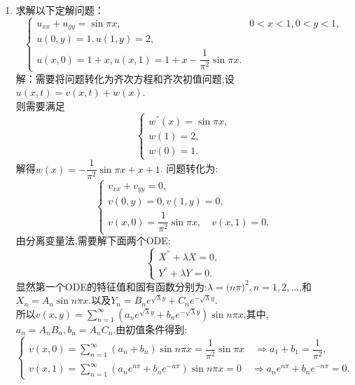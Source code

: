 \documentclass[11pt]{article}
\begin{document}
\begin{enumerate}
        \item 求解以下定解问题：
           \[
        \left\{
         \begin{array}{lr}
         u_{xx}+u_{yy}=\sin \pi x,&0<x<1,0<y<1, \\
         u(0,y)=1,u(1,y)=2, \\
         u(x,0)=1+x,u(x,1)=1+x-\dfrac{1}{\pi^2}\sin\pi x.
         \end{array}
        \right. \]
            解：需要将问题转化为齐次方程和齐次初值问题,设$u(x,t)=v(x,t)+w(x)$.\\
        则需要满足\[
        \begin{cases}
            w^{''}(x)=\sin\pi x,\\
            w(1)=2,\\
            w(0)=1.
        \end{cases}
        \]
        解得$w(x)=-\dfrac{1}{\pi^2}\sin \pi x+x+1$.
        问题转化为:\[
        \left\{
         \begin{array}{lr}
         v_{xx}+v_{yy}=0, \\
         v(0,y)=0,v(1,y)=0, \\
         v(x,0)=\dfrac{1}{\pi^2}\sin \pi x,\quad v(x,1)=0.
         \end{array}
        \right. \]
        由分离变量法,需要解下面两个ODE:\[
        \begin{cases}
            X^{''}+\lambda X=0,\\
            Y^{''}+\lambda Y=0.
        \end{cases}
        \]
        显然第一个ODE的特征值和固有函数分别为:$\lambda=\big(n\pi\big)^2,n=1,2,\dots$,和$X_n=A_n\sin n\pi x$.以及$Y_n=B_{n}e^{\sqrt {\lambda}y}+C_n e^{-\sqrt {\lambda}y}$.\\
        所以$v(x,y)=\sum\limits_{n=1}^{\infty}(a_{n}e^{\sqrt {\lambda}y}+b_n e^{-\sqrt {\lambda}y})\sin n\pi x$,其中,$a_n=A_n B_n,b_n=A_n C_n$.由初值条件得到:
        \[
        \begin{cases}
            v(x,0)=\sum\limits_{n=1}^{\infty}(a_n+b_n)\sin n\pi x=\dfrac{1}{\pi^2}\sin \pi x \quad\Rightarrow a_1+b_1=\dfrac{1}{\pi^2},\\
            v(x,1)=\sum\limits_{n=1}^{\infty}(a_n e^{n\pi}+b_n e^{-n\pi})\sin n\pi x = 0 \quad\Rightarrow a_n e^{n\pi}+b_n e^{-n\pi}=0.
        \end{cases}
        \]
    \end{enumerate}


    \setlength{\topmargin}{-18mm}
\end{document}
